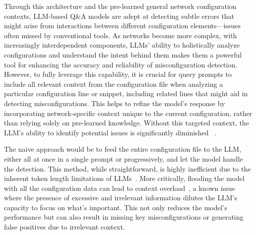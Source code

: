 Through this architecture and the pre-learned general network configuration contexts, LLM-based Q\&A models are adept at detecting subtle errors that might arise from interactions between different configuration elements—issues often missed by conventional tools. As networks become more complex, with increasingly interdependent components, LLMs' ability to holistically analyze configurations and understand the intent behind them makes them a powerful tool for enhancing the accuracy and reliability of misconfiguration detection.
However, to fully leverage this capability, it is crucial for query
prompts to include all relevant context from the configuration file
when analyzing a particular configuration line or snippet,
including related lines that might aid in detecting misconfigurations. 
This helps to refine the model's response by incorporating network-specific context unique to the current configuration, rather than relying solely on pre-learned knowledge. Without this targeted context, the LLM's ability to identify potential issues is significantly diminished ~\cite{liskavets2024prompt,tian2024examining,khurana2024and, shvartzshnaider2024llm}.

The naive approach would be to feed the entire configuration file to the LLM, either all at once in a single prompt or progressively, and let the model handle the detection. This method, while straightforward, is highly inefficient due to the inherent token length limitations of LLMs~\cite{xue2024repeat,yu2024breaking,gu2023mamba}. More critically, flooding the model with all the configuration data can lead to context overload~\cite{lican,li2024long,qian2024long}, a known issue where the presence of excessive and irrelevant information dilutes the LLM’s capacity to focus on what’s important. This not only reduces the model’s performance but can also result in missing key misconfigurations or generating false positives due to irrelevant context. 

